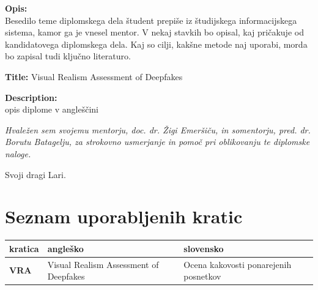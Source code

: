 \documentclass[a4paper,12pt,openright]{book}
\newcommand{\clearemptydoublepage}{\newpage{\pagestyle{empty}\cleardoublepage}}
\begin{document}
\bigskip
\noindent\textbf{Opis:}\\
Besedilo teme diplomskega dela študent prepiše iz študijskega informacijskega sistema, kamor ga je vnesel mentor. 
V nekaj stavkih bo opisal, kaj pričakuje od kandidatovega diplomskega dela. 
Kaj so cilji, kakšne metode naj uporabi, morda bo zapisal tudi ključno literaturo.

\bigskip
\noindent\textbf{Title:} Visual Realism Assessment of Deepfakes

\bigskip
\noindent\textbf{Description:}\\
opis diplome v angleščini

\vfill



\vspace{2cm}

\clearemptydoublepage

\thispagestyle{empty}\mbox{}\vfill\null\it%
\noindent
Hvaležen sem svojemu mentorju, doc. dr. Žigi Emeršiču, in somentorju, pred. dr. Borutu Batagelju, za strokovno usmerjanje in pomoč pri oblikovanju te diplomske naloge.
\rm\normalfont

\clearemptydoublepage

\thispagestyle{empty}\mbox{}{\textheight}\mbox{}\hfill\begin{minipage}{0.55\textwidth}%
Svoji dragi Lari.
\normalfont\end{minipage}

\clearemptydoublepage

\pagestyle{empty}
\def\thepage{}%
\tableofcontents{}


\clearemptydoublepage

\chapter*{Seznam uporabljenih kratic}

\noindent\begin{tabular}{p{}|p{}|p{}}    %
  {\bf kratica} & {\bf angleško}                              & {\bf slovensko} \\ \hline
  {\bf VRA}      & Visual Realism Assessment of Deepfakes              &  Ocena kakovosti ponarejenih posnetkov \\

\end{tabular}
\end{document}
